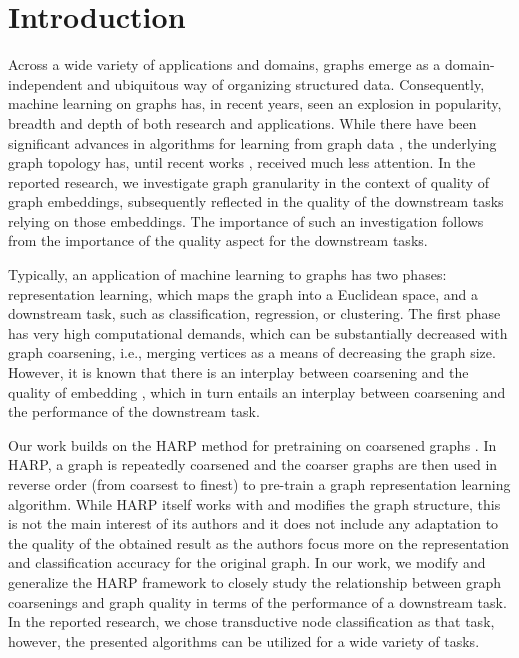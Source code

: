 \section{Introduction}
Across a wide variety of applications and domains, graphs emerge as a domain-independent and ubiquitous way of organizing structured data. Consequently, machine learning on graphs has, in recent years, seen an explosion in popularity, breadth and depth of both research and applications. While there have been significant advances in algorithms for learning from graph data \cite{defferrard_convolutional_2016,kipf_semi-supervised_2017}, the underlying graph topology has, until recent works \cite{topping_understanding_2021,velickovic_geometric_2021}, received much less attention. In the reported research, we investigate graph granularity in the context of quality of graph embeddings, subsequently reflected in the quality of the downstream tasks relying on those embeddings. The importance of such an investigation follows from the importance of the quality aspect for the downstream tasks.

Typically, an application of machine learning to graphs has two phases: representation learning, which maps the graph into a Euclidean space, and a downstream task, such as classification, regression, or clustering. The first phase has very high computational demands, which can be substantially decreased with graph coarsening, i.e., merging vertices as a means of decreasing the graph size. However, it is known that there is an interplay between coarsening and the quality of embedding \cite{akyildiz_understanding_2020,makarov_survey_2021}, which in turn entails an interplay between coarsening and the performance of the downstream task.

Our work builds on the HARP method for pretraining on coarsened graphs \cite{chen_harp_2018}. In HARP, a graph is repeatedly coarsened and the coarser graphs are then used in reverse order (from coarsest to finest) to pre-train a graph representation learning algorithm. While HARP itself works with and modifies the graph structure, this is not the main interest of its authors and it does not include any adaptation to the quality of the obtained result as the authors focus more on the representation and classification accuracy for the original graph. In our work, we modify and generalize the HARP framework to closely study the relationship between graph coarsenings and graph quality in terms of the performance of a downstream task. In the reported research, we chose transductive node classification as that task, however, the presented algorithms can be utilized for a wide variety of tasks.

